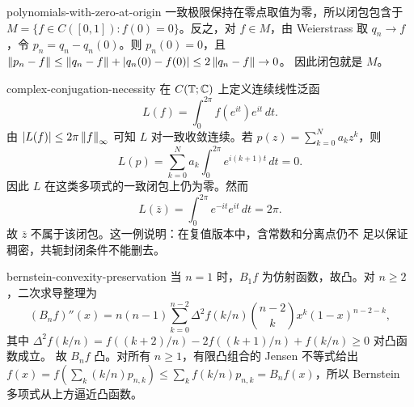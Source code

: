 \begin{solution}{polynomials-with-zero-at-origin}
一致极限保持在零点取值为零，所以闭包包含于
$M=\{f\in C([0,1]):f(0)=0\}$。反之，对 $f\in M$，由 Weierstrass 取
$q_n\to f$，令 $p_n=q_n-q_n(0)$。则 $p_n(0)=0$，且
$\left\lVert p_n-f\right\rVert\le\left\lVert q_n-f\right\rVert+|q_n(0)-f(0)|\le2\left\lVert q_n-f\right\rVert\to0$。
因此闭包就是 $M$。
\end{solution}

\begin{solution}{complex-conjugation-necessity}
在 $C(\mathbb T;\mathbb{C})$ 上定义连续线性泛函
\[
 L(f)=\int_0^{2\pi} f(e^{it})e^{it}\,dt .
\]
由 $|L(f)|\le2\pi\left\lVert f\right\rVert_\infty$ 可知 $L$ 对一致收敛连续。若
$p(z)=\sum_{k=0}^Na_kz^k$，则
\[
 L(p)=\sum_{k=0}^Na_k\int_0^{2\pi}e^{i(k+1)t}\,dt=0.
\]
因此 $L$ 在这类多项式的一致闭包上仍为零。然而
\[
 L(\bar z)=\int_0^{2\pi}e^{-it}e^{it}\,dt=2\pi.
\]
故 $\bar z$ 不属于该闭包。这一例说明：在复值版本中，含常数和分离点仍不
足以保证稠密，共轭封闭条件不能删去。
\end{solution}

\begin{solution}{bernstein-convexity-preservation}
当 $n=1$ 时，$B_1f$ 为仿射函数，故凸。对 $n\ge2$，二次求导整理为
\[
 (B_nf)''(x)=n(n-1)\sum_{k=0}^{n-2}
 \Delta^2f(k/n)\binom{n-2}kx^k(1-x)^{n-2-k},
\]
其中
$\Delta^2f(k/n)=f((k+2)/n)-2f((k+1)/n)+f(k/n)\ge0$ 对凸函数成立。
故 $B_nf$ 凸。对所有 $n\ge1$，有限凸组合的 Jensen 不等式给出
$f(x)=f(\sum_k(k/n)p_{n,k})\le\sum_kf(k/n)p_{n,k}=B_nf(x)$，所以
Bernstein 多项式从上方逼近凸函数。
\end{solution}
